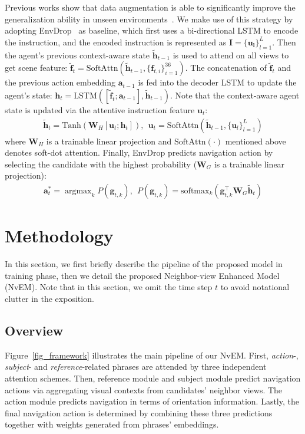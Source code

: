 \documentclass[sigconf]{acmart}
\begin{document}
Previous works show that data augmentation is able to significantly improve the generalization ability in unseen environments~\cite{fried2018speaker,tan2019envdrop}. 
We make use of this strategy by adopting EnvDrop~\cite{tan2019envdrop} as baseline, which first uses a bi-directional LSTM to encode the instruction, and the encoded instruction is represented as $\mathbf{I}=\{\mathbf{u_l}\}_{l=1}^L$.
Then the agent's previous context-aware state $\tilde{\mathbf{h}}_{t-1}$ is used to attend on all views to get scene feature: $\tilde{\mathbf{f}}_t=\textrm{SoftAttn}(\tilde{\mathbf{h}}_{t-1},\{\mathbf{f}_{t,i}\}_{i=1}^{36})$.
The concatenation of $\tilde{\mathbf{f}}_t$ and the previous action embedding $\mathbf{a}_{t-1}$ is fed into the decoder LSTM to update the agent's state: $\mathbf{h}_t=\textrm{LSTM}([\tilde{\mathbf{f}}_t;\mathbf{a}_{t-1}],\tilde{\mathbf{h}}_{t-1})$. 
Note that the context-aware agent state is updated via the attentive instruction feature $\mathbf{u}_t$:
\begin{equation}
	\begin{aligned}\label{form_ht}
		\tilde{\mathbf{h}}_t=\textrm{Tanh}(\mathbf{W}_H[\mathbf{u}_t;\mathbf{h}_t]), \ \
		\mathbf{u}_t=\textrm{SoftAttn}(\tilde{\mathbf{h}}_{t-1},\{\mathbf{u}_{l}\}_{l=1}^{L})
	\end{aligned}
\end{equation}
where $\mathbf{W}_H$ is a trainable linear projection and $\textrm{SoftAttn}(\cdot)$ mentioned above denotes soft-dot attention.
Finally, EnvDrop predicts navigation action by selecting the candidate with the highest probability ($\mathbf{W}_G$ is a trainable linear projection):
\begin{align}\label{form_select_action}
	\mathbf{a}_t^*=\mathop{\arg\max}_k P(\mathbf{g}_{t,k}), \ \ P(\mathbf{g}_{t,k})=\textrm{softmax}_k(\mathbf{g}_{t,k}^\top \mathbf{W}_G \tilde{\mathbf{h}}_t)
\end{align}

\section{Methodology}
In this section, we first briefly describe the pipeline of the proposed model in training phase, then we detail the proposed Neighbor-view Enhanced Model (NvEM). 
Note that in this section, we omit the time step $t$ to avoid notational clutter in the exposition.

\subsection{Overview}
Figure~\ref{fig_framework} illustrates the main pipeline of our NvEM. First, \textit{action}-, \textit{subject}- and \textit{reference}-related phrases are attended by three independent attention schemes. 
Then, reference module and subject module predict navigation actions via aggregating visual contexts from candidates' neighbor views. The action module predicts navigation in terms of orientation information.
Lastly, the final navigation action is determined by combining these three predictions together with weights generated from phrases' embeddings.
\end{document}

